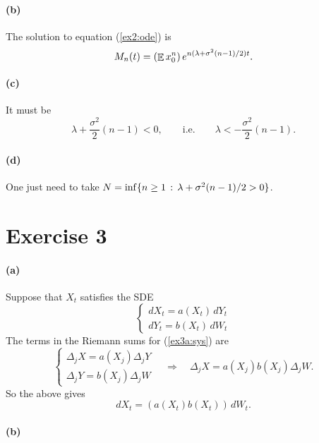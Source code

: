 \documentclass[a4paper,11pt]{article}
\theoremstyle{definition}
\theoremstyle{plain}
\theoremstyle{remark}
\DeclarePairedDelimiter{\parr}{(}{)}
\DeclarePairedDelimiter{\bra}{\lbrace}{\rbrace}
\DeclareMathOperator*{\expval}{\mathbb{E}}
\begin{document}
\paragraph*{(b)}

The solution to equation (\ref{ex2:ode}) is 
$$
M_n(t) = \parr*{\expval x_0^n}\,e^{n(\lambda + \sigma^2(n-1)/2)t}.
$$

\paragraph*{(c)}

It must be 
$$
\lambda + \frac{\sigma^2}{2}(n-1) < 0, \qquad \text{i.e.} \qquad \lambda < - \frac{\sigma^2}{2}(n-1).
$$

\paragraph*{(d)}

One just need to take $N = \inf\bra{n\geq1\,:\,\lambda+\sigma^2(n-1)/2>0}$.

\section*{Exercise 3}

\paragraph*{(a)}

Suppose that $X_t$ satisfies the SDE 
\begin{equation}
\begin{cases} dX_t = a(X_t)\,dY_t \\ dY_t = b(X_t)\,dW_t \end{cases}
\label{ex3a:sys}
\end{equation}
The terms in the Riemann sums for (\ref{ex3a:sys}) are
$$
\begin{cases} \Delta_j X  = a(X_j)\Delta_j Y \\  \Delta_j Y = b(X_j)\Delta_j W \end{cases} \quad\Longrightarrow\quad \Delta_j X = a(X_j)b(X_j)\Delta_j W.
$$
So the above gives 
$$
dX_t = (a(X_t)b(X_t))\,dW_t.
$$

\paragraph*{(b)}
\end{document}
